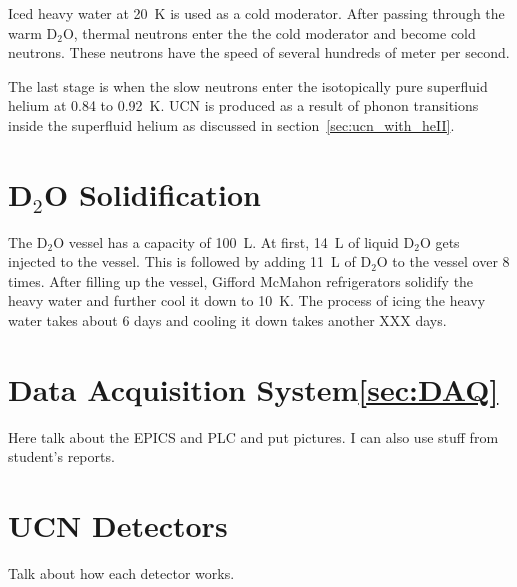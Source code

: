 Iced heavy water at 20~K is used as a cold moderator. After passing
through the warm D$_2$O, thermal neutrons enter the the cold moderator
and become cold neutrons. These neutrons have the speed of several
hundreds of meter per second.

The last stage is when the slow neutrons enter the isotopically pure superfluid helium
at 0.84 to 0.92~K. UCN is produced as a result of phonon transitions
inside the superfluid helium as discussed in section~\ref{sec:ucn_with_heII}.


\section{D$_2$O Solidification}
The D$_2$O vessel has a capacity of 100~L. At first, 14~L of liquid
D$_2$O gets injected to the vessel. This is followed by adding 11~L of
D$_2$O to the vessel over 8 times.  After filling up the vessel,
Gifford McMahon refrigerators solidify the heavy water and further
cool it down to 10~K. The process of icing the heavy water takes about
6 days and cooling it down takes another XXX days.

\section{Data Acquisition System\ref{sec:DAQ}}
Here talk about the EPICS and PLC and put pictures. I can also use
stuff from student's reports.

\section{UCN Detectors}
Talk about how each detector works.
